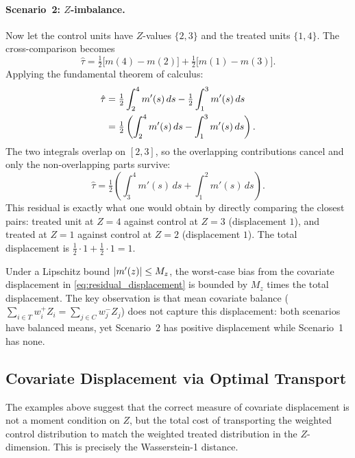 \paragraph{Scenario~2: $Z$-imbalance.}
Now let the control units have $Z$-values $\{2, 3\}$ and the treated units $\{1, 4\}$.
The cross-comparison becomes
\begin{equation}\label{eq:cross_comparison}
	\hat{\tau} = \tfrac{1}{2}\bigl[m(4) - m(2)\bigr] + \tfrac{1}{2}\bigl[m(1) - m(3)\bigr].
\end{equation}
Applying the fundamental theorem of calculus:
\begin{align}
	\hat{\tau} &= \tfrac{1}{2}\int_2^4 m'(s)\, ds - \tfrac{1}{2}\int_1^3 m'(s)\, ds \notag \\
	&= \tfrac{1}{2}\left(\int_2^4 m'(s)\, ds - \int_1^3 m'(s)\, ds\right). \label{eq:cross_integrals}
\end{align}
The two integrals overlap on $[2,3]$, so the overlapping contributions cancel and only the non-overlapping parts survive:
\begin{equation}\label{eq:residual_displacement}
	\hat{\tau} = \tfrac{1}{2}\left(\int_3^4 m'(s)\, ds + \int_1^2 m'(s)\, ds\right).
\end{equation}
This residual is exactly what one would obtain by directly comparing the closest pairs: treated unit at $Z = 4$ against control at $Z = 3$ (displacement $1$), and treated at $Z = 1$ against control at $Z = 2$ (displacement $1$).
The total displacement is $\tfrac{1}{2} \cdot 1 + \tfrac{1}{2} \cdot 1 = 1$.

Under a Lipschitz bound $\lvert m'(z)\rvert \leq M_z$, the worst-case bias from the covariate displacement in \eqref{eq:residual_displacement} is bounded by $M_z$ times the total displacement.
The key observation is that mean covariate balance ($\sum_{i \in T} w_i^+ Z_i = \sum_{j \in C} w_j^- Z_j$) does not capture this displacement: both scenarios have balanced means, yet Scenario~2 has positive displacement while Scenario~1 has none.


\subsection{Covariate Displacement via Optimal Transport}\label{sec:appendix:zdisplacement:transport}

The examples above suggest that the correct measure of covariate displacement is not a moment condition on $Z$, but the total cost of transporting the weighted control distribution to match the weighted treated distribution in the $Z$-dimension.
This is precisely the Wasserstein-1 distance.

